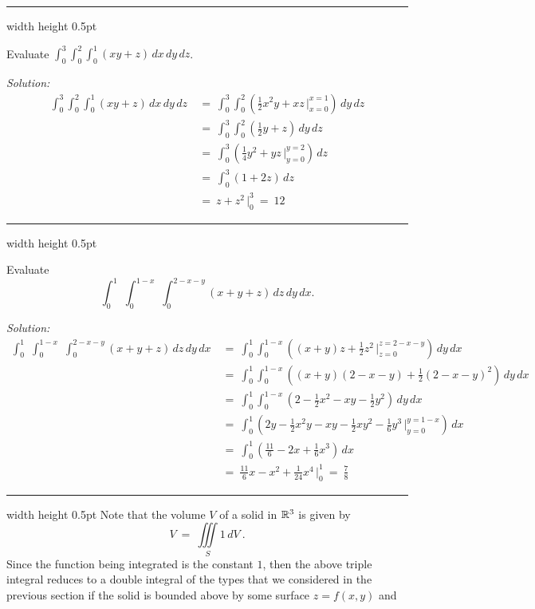\medskip
\hrule width \textwidth height 0.5pt
\begin{exmp}
 Evaluate $\displaystyle\int_0^3 \displaystyle\int_0^2 \displaystyle\int_0^1 (xy+z) \,dx\,dy\,dz$.\smallskip
 \par\noindent \emph{Solution:}
 \begin{align*}
  \int_0^3 \int_0^2 \int_0^1 (xy+z) \,dx\,dy\,dz ~&=~
   \int_0^3 \int_0^2 \left( \tfrac{1}{2}x^2 y + xz \, \Big|_{x=0}^{x=1} \right) \,dy\,dz\\
   &=~ \int_0^3 \int_0^2 \left( \tfrac{1}{2}y + z \right) \,dy\,dz\\
   &=~ \int_0^3 \left( \tfrac{1}{4}y^2 + yz \,\Big|_{y=0}^{y=2} \right) \,dz\\
   &=~ \int_0^3 (1+2z) \,dz\\
   &=~ z + z^2 \,\Big|_0^3 ~=~ 12
 \end{align*}
\end{exmp}
\hrule width \textwidth height 0.5pt
\begin{exmp}
 Evaluate 
 \[\int_0^1\,\, \int_0^{1-x}\,\, \int_0^{2-x-y} (x+y+z)\,dz\,dy\,dx.\]
 \par\noindent \emph{Solution:}
 \begin{align*}
  \int_0^1\,\, \int_0^{1-x}\,\, \int_0^{2-x-y} (x+y+z) \,dz\,dy\,dx ~&=~
   \int_0^1 \int_0^{1-x} \left( (x+y)z+ \tfrac{1}{2}z^2 \, \Big|_{z=0}^{z=2-x-y} \right) \,dy\,dx\\
   &=~ \int_0^1 \int_0^{1-x} \left( (x+y)(2-x-y) + \tfrac{1}{2}(2-x-y)^2 \right) \,dy\,dx\\
   &=~ \int_0^1 \int_0^{1-x} \left( 2 - \tfrac{1}{2}x^2 - xy - \tfrac{1}{2}y^2 \right) \,dy\,dx\\
   &=~ \int_0^1 \left( 2y-\tfrac{1}{2}x^2 y -xy- \tfrac{1}{2}xy^2 - \tfrac{1}{6}y^3 \,\Big|_{y=0}^{y=1-x} \right) \,dx\\
   &=~ \int_0^1 \left( \tfrac{11}{6} - 2x + \tfrac{1}{6}x^3 \right) \,dx\\
   &=~ \tfrac{11}{6}x - x^2 + \tfrac{1}{24}x^4 \,\Big|_0^1 ~=~ \tfrac{7}{8}
 \end{align*}
\end{exmp}
\hrule width \textwidth height 0.5pt
\smallskip
Note that the volume $V$ of a solid in $\mathbb{R}^{3}$ is given by
\begin{equation}
 V ~=~ \iiint\limits_{S} 1\,dV ~.
\end{equation}
Since the function being integrated is the constant $1$, then the above triple integral reduces to a double integral of
the types that we considered in the previous section if the solid is bounded above by some surface $z=f(x,y)$ and
